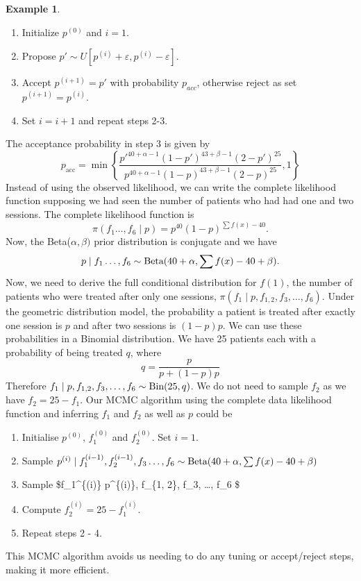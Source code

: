 \documentclass[
]{book}
\providecommand{\tightlist}{%
  \setlength{\itemsep}{0pt}\setlength{\parskip}{0pt}}
\theoremstyle{definition}
\theoremstyle{definition}
\newtheorem{example}{Example}[chapter]
\theoremstyle{definition}
\theoremstyle{definition}
\theoremstyle{remark}
\begin{document}
\begin{example}
\begin{enumerate}
\def\labelenumi{\arabic{enumi}.}
\tightlist
\item
  Initialize \(p^{(0)}\) and \(i = 1\).
\item
  Propose \(p' \sim U[p^{(i)} + \varepsilon, p^{(i)} - \varepsilon]\).
\item
  Accept \(p^{(i+1)}=p'\) with probability \(p_{acc}\), otherwise reject as set \(p^{(i+1)}=p^{(i)}\).
\item
  Set \(i=i+1\) and repeat steps 2-3.
\end{enumerate}

The acceptance probability in step 3 is given by
\[
p_{\textrm{acc}} = \min\left\{\frac{p'^{40 + \alpha - 1}(1-p')^{43 + \beta - 1}(2-p')^{25}}{p^{40 + \alpha - 1}(1-p)^{43 + \beta - 1}(2-p)^{25}} ,1\right\}
\]
Instead of using the observed likelihood, we can write the complete likelihood function supposing we had seen the number of patients who had had one and two sessions. The complete likelihood function is
\[
\pi(f_1 \ldots, f_6 \mid p) = p^{40}(1-p)^{\sum f(x) - 40}. 
\]
Now, the Beta(\(\alpha, \beta)\) prior distribution is conjugate and we have
\[
p \mid f_1 \ldots, f_6  \sim \hbox{Beta}(40 + \alpha, \sum f(x) - 40 + \beta).
\]
Now, we need to derive the full conditional distribution for \(f(1)\), the number of patients who were treated after only one sessions, \(\pi(f_1 \mid p, f_{1, 2}, f_3, \ldots, f_6)\). Under the geometric distribution model, the probability a patient is treated after exactly one session is \(p\) and after two sessions is \((1-p)p\). We can use these probabilities in a Binomial distribution. We have 25 patients each with a probability of being treated \(q\), where
\[
q = \frac{p}{p + (1-p)p}
\]
Therefore \(f_1 \mid p, f_{1, 2}, f_3, \ldots, f_6 \sim \hbox{Bin}(25, q)\). We do not need to sample \(f_2\) as we have \(f_2 = 25 - f_1\). Our MCMC algorithm using the complete data likelihood function and inferring \(f_1\) and \(f_2\) as well as \(p\) could be

\begin{enumerate}
\def\labelenumi{\arabic{enumi}.}
\tightlist
\item
  Initialise \(p^{(0)}\), \(f_1^{(0)}\) and \(f_2^{(0)}\). Set \(i = 1\).
\item
  Sample \(p^{(i)} \mid f_1^{(i-1)}, f_2^{(i-1)}, f_3 \ldots, f_6 \sim \hbox{Beta}(40 + \alpha, \sum f(x) - 40 + \beta)\)
\item
  Sample \$f\_1\^{}\{(i)\} \mid p\^{}\{(i)\}, f\_\{1, 2\}, f\_3, \ldots, f\_6 \$
\item
  Compute \(f_2^{(i)} = 25 - f_1^{(i)}\).
\item
  Repeat steps 2 - 4.
\end{enumerate}

This MCMC algorithm avoids us needing to do any tuning or accept/reject steps, making it more efficient.
\end{example}
\end{document}
